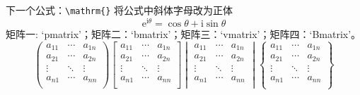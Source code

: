 \documentclass[a4paper, 12pt]{article} %
\numberwithin{equation}{section} %
\numberwithin{figure}{section} %
\begin{document}
            下一个公式：\verb|\mathrm{}| 将公式中斜体字母改为正体
            \begin{equation}
                \mathrm{e}^{\mathrm{i}\theta} = \cos\theta + \mathrm{i}\sin\theta
            \end{equation}
            矩阵一: `pmatrix'；矩阵二：`bmatrix'；矩阵三：`vmatrix'；矩阵四：`Bmatrix'。
            \begin{equation}
                \begin{pmatrix}
                    a_{11} & \cdots & a_{1n} \\
                    a_{21} & \cdots & a_{2n} \\
                    \vdots & \ddots & \vdots \\
                    a_{n1} & \cdots & a_{nn} \\
                \end{pmatrix}
                \begin{bmatrix}
                    a_{11} & \cdots & a_{1n} \\
                    a_{21} & \cdots & a_{2n} \\
                    \vdots & \ddots & \vdots \\
                    a_{n1} & \cdots & a_{nn} \\
                \end{bmatrix}
                \begin{vmatrix}
                    a_{11} & \cdots & a_{1n} \\
                    a_{21} & \cdots & a_{2n} \\
                    \vdots & \ddots & \vdots \\
                    a_{n1} & \cdots & a_{nn} \\
                \end{vmatrix}
                \begin{Bmatrix}
                    a_{11} & \cdots & a_{1n} \\
                    a_{21} & \cdots & a_{2n} \\
                    \vdots & \ddots & \vdots \\
                    a_{n1} & \cdots & a_{nn} \\
                \end{Bmatrix}
            \end{equation}
\end{document}
